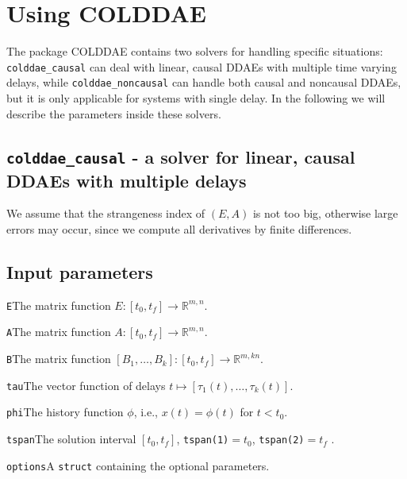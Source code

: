 \documentclass[final,reqno]{siamltex}
\renewenvironment{itemize}[1]{\begin{compactitem}#1}{\end{compactitem}}
\begin{document}
\section{Using COLDDAE}

The package COLDDAE contains two solvers for handling specific situations: {\tt colddae\_causal} can deal with linear, causal DDAEs with multiple time varying delays, 
while {\tt colddae\_noncausal} can handle both causal and noncausal DDAEs, but it is only applicable for systems with single delay. 
In the following we will describe the parameters inside these solvers.

\subsection{{\tt colddae\_causal} - a solver for linear, causal DDAEs with multiple delays}

We assume that the strangeness index of $(E,A)$ is not too big, otherwise large errors may occur, since we compute all derivatives by finite differences.

\subsection{Input parameters}
\begin{itemize}
\item {\tt E}\quad The matrix function $E:[t_0,t_f]\rightarrow \mathbb{R}^{m,n}$.
\item {\tt A}\quad The matrix function $A:[t_0,t_f]\rightarrow \mathbb{R}^{m,n}$.
\item {\tt B}\quad The matrix function $[B_1,\ldots,B_{k}]:[t_0,t_f]\rightarrow \mathbb{R}^{m,k n}$.
\item {\tt tau}\quad  The vector function of delays $t\mapsto[\tau_1(t),\ldots,\tau_{k}(t)]$.
\item {\tt phi}\quad The history function $\phi$, i.e.,  $x(t)=\phi(t)$ for $t < t_0$.
\item {\tt tspan}\quad The solution interval $[t_0,t_f]$, {\tt tspan(1)}$ = t_0$, {\tt tspan(2)}$ = t_f$ .
\item {\tt options}\quad A {\tt struct} containing the optional parameters.
\end{itemize}
\end{document}
